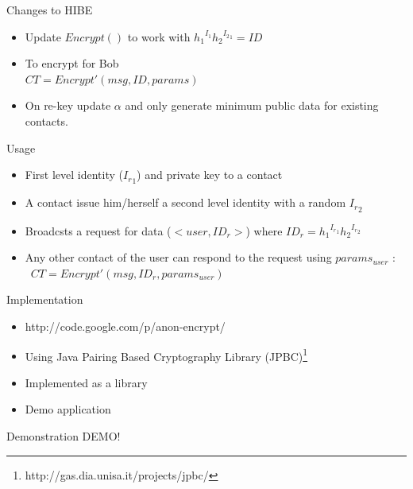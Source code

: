 \documentclass{beamer}
\begin{document}
\begin{frame}{Changes to HIBE}

\begin{itemize}
\item Update $Encrypt()$ to work with ${h_1}^{I_1}{h_2}^{{I_2}_1} = ID$
\item To encrypt for Bob \\ $CT = Encrypt'(msg, ID, params)$
\item On re-key update $\alpha$ and only generate minimum public data for existing contacts.
\end{itemize}
\end{frame}

\begin{frame}{Usage}
\begin{itemize}
\item First level identity (${I_r}_1$) and private key to a contact
\item A contact issue him/herself a second level identity with a random ${I_r}_2$
\item Broadcsts a request for data ($<user, ID_r>$) where $ID_r = {h_1}^{{I_r}_1}{h_2}^{{I_r}_2}$
\item Any other contact of the user can respond to the request using $params_{user}$ : \\\
$CT = Encrypt'(msg, ID_r, params_{user})$
\end{itemize}
\end{frame}



\begin{frame}{Implementation}
\begin{itemize}
\item http://code.google.com/p/anon-encrypt/
\item Using Java Pairing Based Cryptography Library (JPBC)\footnote{http://gas.dia.unisa.it/projects/jpbc/}
\item Implemented as a library
\item Demo application
\end{itemize}
\end{frame}

\begin{frame}{Demonstration}
\Huge{DEMO!}
\end{frame}
\end{document}

